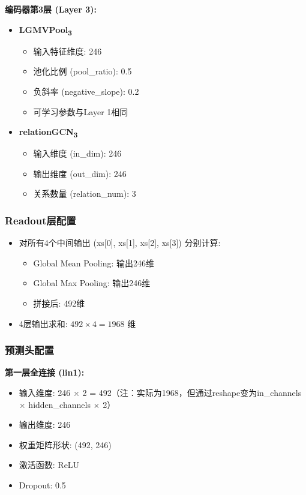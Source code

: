 \textbf{编码器第3层 (Layer 3):}

\begin{itemize}
    \item \textbf{LGMVPool\textsubscript{3}}
    \begin{itemize}
        \item 输入特征维度: 246
        \item 池化比例 (pool\_ratio): 0.5
        \item 负斜率 (negative\_slope): 0.2
        \item 可学习参数与Layer 1相同
    \end{itemize}
    \item \textbf{relationGCN\textsubscript{3}}
    \begin{itemize}
        \item 输入维度 (in\_dim): 246
        \item 输出维度 (out\_dim): 246
        \item 关系数量 (relation\_num): 3
    \end{itemize}
\end{itemize}

\subsubsection{Readout层配置}

\begin{itemize}
    \item 对所有4个中间输出 (xs[0], xs[1], xs[2], xs[3]) 分别计算:
    \begin{itemize}
        \item Global Mean Pooling: 输出246维
        \item Global Max Pooling: 输出246维
        \item 拼接后: 492维
    \end{itemize}
    \item 4层输出求和: $492 \times 4 = 1968$ 维
\end{itemize}

\subsubsection{预测头配置}

\textbf{第一层全连接 (lin1):}
\begin{itemize}
    \item 输入维度: 246 $\times$ 2 = 492（注：实际为1968，但通过reshape变为in\_channels $\times$ hidden\_channels $\times$ 2）
    \item 输出维度: 246
    \item 权重矩阵形状: (492, 246)
    \item 激活函数: ReLU
    \item Dropout: 0.5
\end{itemize}

